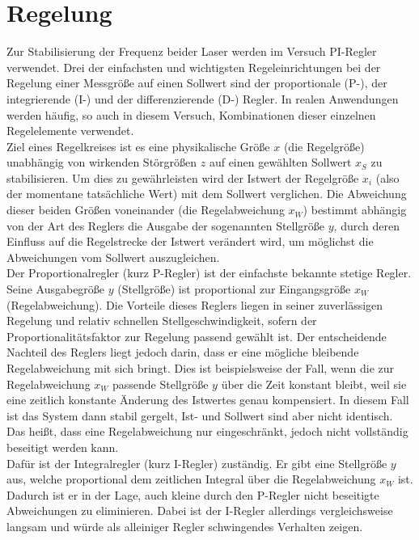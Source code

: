 \documentclass[
class=book,
accentcolor=1b,
custommargins=geometry,
fontsize=11pt,
thesis={type=Versuchsanleitung},
ruledheaders=all,
headline=false,
instbox=false,
marginpar=false,
title=small,
ignore-missing-data=true,
twoside=false,
logofile=apqdesign/tuda_logo.pdf,
pdfa=false %
]{apqpub}
\begin{document}
			\section{Regelung}			
			Zur Stabilisierung der Frequenz beider Laser werden im Versuch PI-Regler verwendet. 
			Drei der einfachsten und wichtigsten Regeleinrichtungen bei der Regelung einer Messgröße auf einen Sollwert sind der proportionale (P-), der integrierende (I-) und der differenzierende (D-) Regler.
			In realen Anwendungen werden häufig, so auch in diesem Versuch, Kombinationen dieser einzelnen Regelelemente verwendet.\\			
			Ziel eines Regelkreises ist es eine physikalische Größe $x$ (die Regelgröße) unabhängig von wirkenden Störgrößen $z$ auf einen gewählten Sollwert $x_S$ zu stabilisieren.
			Um dies zu gewährleisten wird der Istwert der Regelgröße $x_i$ (also der momentane tatsächliche Wert) mit dem Sollwert verglichen. 
			Die Abweichung dieser beiden Größen voneinander (die Regelabweichung $x_W$) bestimmt abhängig von der Art des Reglers die Ausgabe der sogenannten Stellgröße $y$, durch deren Einfluss auf die Regelstrecke der Istwert verändert wird, um möglichst die Abweichungen vom Sollwert auszugleichen.\\ 
			Der Proportionalregler (kurz P-Regler) ist der einfachste bekannte stetige Regler. 
			Seine Ausgabegröße $y$ (Stellgröße) ist proportional zur Eingangsgröße $x_W$ (Regelabweichung). 
			Die Vorteile dieses Reglers liegen in seiner zuverlässigen Regelung und relativ schnellen Stellgeschwindigkeit, sofern der Proportionalitätsfaktor zur Regelung passend gewählt ist. 
			Der entscheidende Nachteil des Reglers liegt jedoch darin, dass er eine mögliche bleibende Regelabweichung mit sich bringt.		
			Dies ist beispielsweise der Fall, wenn die zur Regelabweichung $x_W$ passende Stellgröße $y$ über die Zeit konstant bleibt, weil sie eine zeitlich konstante Änderung des Istwertes genau kompensiert.
			In diesem Fall ist das System dann stabil gergelt, Ist- und Sollwert sind aber nicht identisch.
			Das heißt, dass eine Regelabweichung nur eingeschränkt, jedoch nicht vollständig beseitigt werden kann.\\
			Dafür ist der Integralregler (kurz I-Regler) zuständig. 
			Er gibt eine Stellgröße $y$ aus, welche proportional dem zeitlichen Integral über die Regelabweichung $x_W$ ist. 
			Dadurch ist er in der Lage, auch kleine durch den P-Regler nicht beseitigte Abweichungen zu eliminieren.
			Dabei ist der I-Regler allerdings vergleichsweise langsam und würde als alleiniger Regler schwingendes Verhalten zeigen. \\
\end{document}
